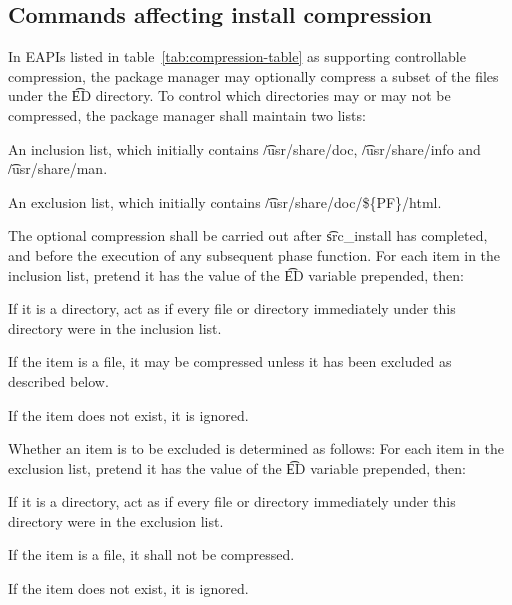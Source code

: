 \subsection{Commands affecting install compression}

 In EAPIs listed in table~\ref{tab:compression-table} as supporting
controllable compression, the package manager may optionally compress a subset of the files under
the \t{ED} directory. To control which directories may or may not be compressed, the package manager
shall maintain two lists:

\begin{compactitem}
\item An inclusion list, which initially contains \t{/usr/share/doc}, \t{/usr/share/info} and
    \t{/usr/share/man}.
\item An exclusion list, which initially contains \t{/usr/share/doc/\$\{PF\}/html}.
\end{compactitem}

The optional compression shall be carried out after \t{src_install} has completed, and before the
execution of any subsequent phase function. For each item in the inclusion list, pretend it has the
value of the \t{ED} variable prepended, then:

\begin{compactitem}
\item If it is a directory, act as if every file or directory immediately under this directory
    were in the inclusion list.
\item If the item is a file, it may be compressed unless it has been excluded as described below.
\item If the item does not exist, it is ignored.
\end{compactitem}

Whether an item is to be excluded is determined as follows: For each item in the exclusion list,
pretend it has the value of the \t{ED} variable prepended, then:

\begin{compactitem}
\item If it is a directory, act as if every file or directory immediately under this directory
    were in the exclusion list.
\item If the item is a file, it shall not be compressed.
\item If the item does not exist, it is ignored.
\end{compactitem}

